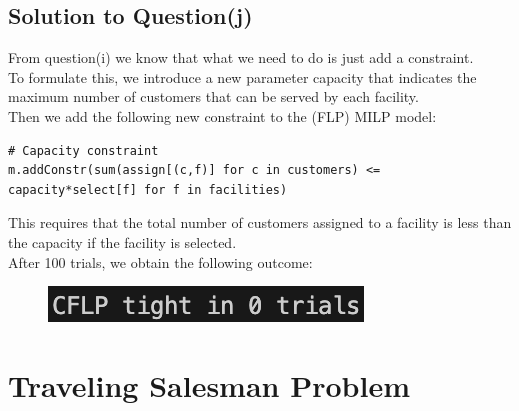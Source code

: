 \documentclass[a4paper]{article}
\begin{document}
\subsection{Solution to Question(j)}
From question(i) we know that what we need to do is just add a constraint.\\
To formulate this, we introduce a new parameter capacity that indicates the maximum number of customers that can be served by each facility.\\
Then we add the following new constraint to the (FLP) MILP model:
\begin{verbatim}
# Capacity constraint 
m.addConstr(sum(assign[(c,f)] for c in customers) <= capacity*select[f] for f in facilities)    
\end{verbatim}
This requires that the total number of customers assigned to a facility is less than the capacity if the facility is selected.\\
After 100 trials, we obtain the following outcome:
\begin{figure}[H]
    \flushleft
    \includegraphics[width=0.25\linewidth]{CFLP-Often.png}
\end{figure}

\section{Traveling Salesman Problem}
\end{document}
